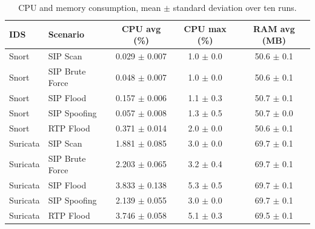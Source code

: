 \begin{table}[t]
\centering
\caption{CPU and memory consumption, mean $\pm$ standard deviation over ten runs.}
\label{tab:resources}
\begin{tabular}{llccc}
\hline
IDS & Scenario & CPU avg (\%) & CPU max (\%) & RAM avg (MB) \\
\hline
Snort & SIP Scan & 0.029 $\pm$ 0.007 & 1.0 $\pm$ 0.0 & 50.6 $\pm$ 0.1 \\
Snort & SIP Brute Force & 0.048 $\pm$ 0.007 & 1.0 $\pm$ 0.0 & 50.6 $\pm$ 0.1 \\
Snort & SIP Flood & 0.157 $\pm$ 0.006 & 1.1 $\pm$ 0.3 & 50.7 $\pm$ 0.1 \\
Snort & SIP Spoofing & 0.057 $\pm$ 0.008 & 1.3 $\pm$ 0.5 & 50.7 $\pm$ 0.0 \\
Snort & RTP Flood & 0.371 $\pm$ 0.014 & 2.0 $\pm$ 0.0 & 50.6 $\pm$ 0.1 \\
\hline
Suricata & SIP Scan & 1.881 $\pm$ 0.085 & 3.0 $\pm$ 0.0 & 69.7 $\pm$ 0.1 \\
Suricata & SIP Brute Force & 2.203 $\pm$ 0.065 & 3.2 $\pm$ 0.4 & 69.7 $\pm$ 0.1 \\
Suricata & SIP Flood & 3.833 $\pm$ 0.138 & 5.3 $\pm$ 0.5 & 69.7 $\pm$ 0.1 \\
Suricata & SIP Spoofing & 2.139 $\pm$ 0.055 & 3.0 $\pm$ 0.0 & 69.7 $\pm$ 0.1 \\
Suricata & RTP Flood & 3.746 $\pm$ 0.058 & 5.1 $\pm$ 0.3 & 69.5 $\pm$ 0.1 \\
\hline
\end{tabular}
\end{table}

